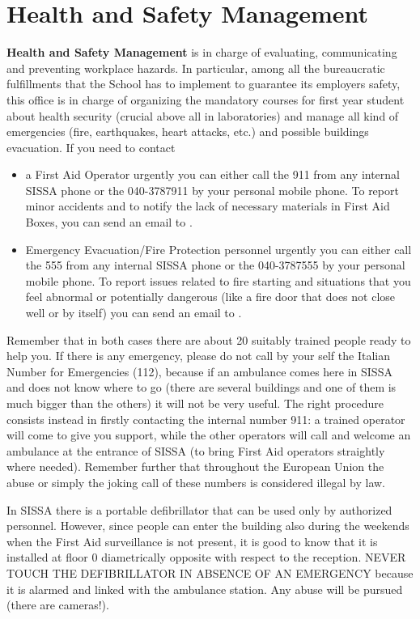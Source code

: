 \documentclass{sissavademecum}
\begin{document}
\chapter{Health and Safety Management}

\textbf{Health and Safety Management} is in charge of evaluating, communicating and preventing workplace hazards. In particular, among all the bureaucratic fulfillments that the School has to implement to guarantee its employers safety, this office is in charge of organizing the mandatory courses for first year student about health security (crucial above all in laboratories) and manage all kind of emergencies (fire, earthquakes, heart attacks, etc.) and possible buildings evacuation. If you need to contact
\begin{itemize}
	\item  a First Aid Operator urgently you can either call the \textcolor[rgb]{0.06666667,0.33333334,0.8}{911} from any internal SISSA phone or the 040-3787911 by your personal mobile phone. To report minor accidents and to notify the lack of necessary materials in First Aid Boxes, you can send an email to . 
	\item Emergency Evacuation/Fire Protection personnel urgently you can either call the \textcolor[rgb]{0.06666667,0.33333334,0.8}{555} from any internal SISSA phone or the 040-3787555 by your personal mobile phone. To report issues related to fire starting and situations that you feel abnormal or potentially dangerous (like a fire door that does not close well or by itself) you can send an email to . 
\end{itemize}
Remember that in both cases there are about 20 suitably trained people ready to help you. If there is any emergency, please do not call by your self the Italian Number for Emergencies (112), because if an ambulance comes here in SISSA and does not know where to go (there are several buildings and one of them is much bigger than the others) it will not be very useful. The right procedure consists instead in firstly contacting the internal number 911: a trained operator will come to give you support, while the other operators will call and welcome an ambulance at the entrance of SISSA (to bring First Aid operators straightly where needed). Remember further that throughout the European Union the abuse or simply the joking call of these numbers is considered illegal by law. 

In SISSA there is a portable defibrillator that can be used only by authorized personnel. However, since people can enter the building also during the weekends when the First Aid surveillance is not present, it is good to know that it is installed at floor $0$ diametrically opposite with respect to the reception. NEVER TOUCH THE DEFIBRILLATOR IN ABSENCE OF AN EMERGENCY because it is alarmed and linked with the ambulance station. Any abuse will be pursued (there are cameras!). 
\end{document}
